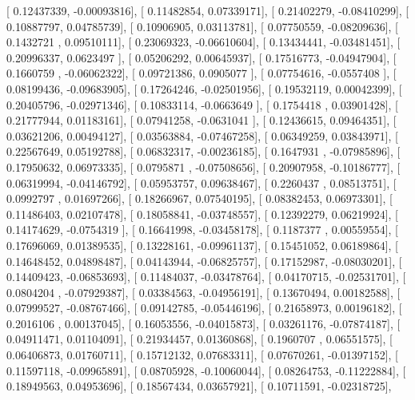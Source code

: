 \documentclass{article}
\begin{document}
       [ 0.12437339, -0.00093816],
       [ 0.11482854,  0.07339171],
       [ 0.21402279, -0.08410299],
       [ 0.10887797,  0.04785739],
       [ 0.10906905,  0.03113781],
       [ 0.07750559, -0.08209636],
       [ 0.1432721 ,  0.09510111],
       [ 0.23069323, -0.06610604],
       [ 0.13434441, -0.03481451],
       [ 0.20996337,  0.0623497 ],
       [ 0.05206292,  0.00645937],
       [ 0.17516773, -0.04947904],
       [ 0.1660759 , -0.06062322],
       [ 0.09721386,  0.0905077 ],
       [ 0.07754616, -0.0557408 ],
       [ 0.08199436, -0.09683905],
       [ 0.17264246, -0.02501956],
       [ 0.19532119,  0.00042399],
       [ 0.20405796, -0.02971346],
       [ 0.10833114, -0.0663649 ],
       [ 0.1754418 ,  0.03901428],
       [ 0.21777944,  0.01183161],
       [ 0.07941258, -0.0631041 ],
       [ 0.12436615,  0.09464351],
       [ 0.03621206,  0.00494127],
       [ 0.03563884, -0.07467258],
       [ 0.06349259,  0.03843971],
       [ 0.22567649,  0.05192788],
       [ 0.06832317, -0.00236185],
       [ 0.1647931 , -0.07985896],
       [ 0.17950632,  0.06973335],
       [ 0.0795871 , -0.07508656],
       [ 0.20907958, -0.10186777],
       [ 0.06319994, -0.04146792],
       [ 0.05953757,  0.09638467],
       [ 0.2260437 ,  0.08513751],
       [ 0.0992797 ,  0.01697266],
       [ 0.18266967,  0.07540195],
       [ 0.08382453,  0.06973301],
       [ 0.11486403,  0.02107478],
       [ 0.18058841, -0.03748557],
       [ 0.12392279,  0.06219924],
       [ 0.14174629, -0.0754319 ],
       [ 0.16641998, -0.03458178],
       [ 0.1187377 ,  0.00559554],
       [ 0.17696069,  0.01389535],
       [ 0.13228161, -0.09961137],
       [ 0.15451052,  0.06189864],
       [ 0.14648452,  0.04898487],
       [ 0.04143944, -0.06825757],
       [ 0.17152987, -0.08030201],
       [ 0.14409423, -0.06853693],
       [ 0.11484037, -0.03478764],
       [ 0.04170715, -0.02531701],
       [ 0.0804204 , -0.07929387],
       [ 0.03384563, -0.04956191],
       [ 0.13670494,  0.00182588],
       [ 0.07999527, -0.08767466],
       [ 0.09142785, -0.05446196],
       [ 0.21658973,  0.00196182],
       [ 0.2016106 ,  0.00137045],
       [ 0.16053556, -0.04015873],
       [ 0.03261176, -0.07874187],
       [ 0.04911471,  0.01104091],
       [ 0.21934457,  0.01360868],
       [ 0.1960707 ,  0.06551575],
       [ 0.06406873,  0.01760711],
       [ 0.15712132,  0.07683311],
       [ 0.07670261, -0.01397152],
       [ 0.11597118, -0.09965891],
       [ 0.08705928, -0.10060044],
       [ 0.08264753, -0.11222884],
       [ 0.18949563,  0.04953696],
       [ 0.18567434,  0.03657921],
       [ 0.10711591, -0.02318725],
\end{document}
